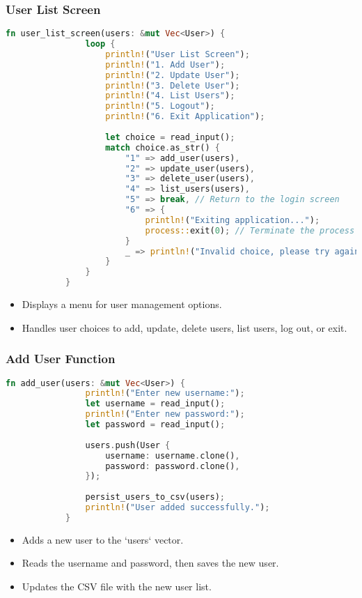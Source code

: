 \documentclass[aspectratio=169, table]{beamer}
\begin{document}
	\begin{frame}[fragile]
		\frametitle{User List Screen}
		\begin{lstlisting}[language=Rust]
			fn user_list_screen(users: &mut Vec<User>) {
				loop {
					println!("User List Screen");
					println!("1. Add User");
					println!("2. Update User");
					println!("3. Delete User");
					println!("4. List Users");
					println!("5. Logout");
					println!("6. Exit Application");
					
					let choice = read_input();
					match choice.as_str() {
						"1" => add_user(users),
						"2" => update_user(users),
						"3" => delete_user(users),
						"4" => list_users(users),
						"5" => break, // Return to the login screen
						"6" => {
							println!("Exiting application...");
							process::exit(0); // Terminate the process
						}
						_ => println!("Invalid choice, please try again."),
					}
				}
			}
		\end{lstlisting}
		\begin{itemize}
			\item Displays a menu for user management options.
			\item Handles user choices to add, update, delete users, list users, log out, or exit.
		\end{itemize}
	\end{frame}
	
	\begin{frame}[fragile]
		\frametitle{Add User Function}
		\begin{lstlisting}[language=Rust]
			fn add_user(users: &mut Vec<User>) {
				println!("Enter new username:");
				let username = read_input();
				println!("Enter new password:");
				let password = read_input();
				
				users.push(User {
					username: username.clone(),
					password: password.clone(),
				});
				
				persist_users_to_csv(users);
				println!("User added successfully.");
			}
		\end{lstlisting}
		\begin{itemize}
			\item Adds a new user to the `users` vector.
			\item Reads the username and password, then saves the new user.
			\item Updates the CSV file with the new user list.
		\end{itemize}
	\end{frame}
	
\end{document}
